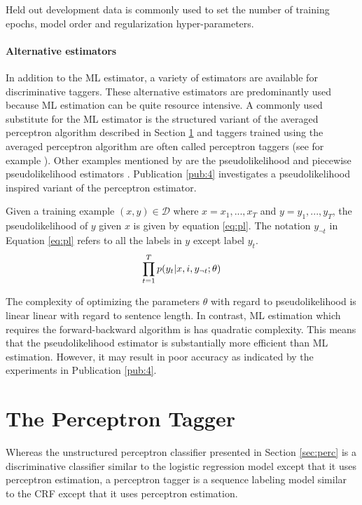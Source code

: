 Held out development data is commonly used to set the number of
training epochs, model order and regularization hyper-parameters.

\paragraph{Alternative estimators} In addition to the ML estimator, a
variety of estimators are available for discriminative taggers. These
alternative estimators are predominantly used because ML estimation
can be quite resource intensive. A commonly used substitute for the ML
estimator is the structured variant of the averaged perceptron
algorithm described in Section \ref{sec:prec-tagger} and taggers
trained using the averaged perceptron algorithm are often called
perceptron taggers (see for example \cite{Collins2002}). Other
examples mentioned by \cite{Sutton2012} are the pseudolikelihood
\cite{Besag1975} and piecewise pseudolikelihood estimators
\cite{Sutton2007}. Publication \ref{pub:4} investigates a
pseudolikelihood inspired variant of the perceptron estimator.

Given a training example $(x,y) \in \mathcal{D}$ where $x = x_1, ..., x_T$ and $y = y_1, ..., y_T$, the pseudolikelihood of $y$ given $x$ is given by equation \ref{eq:pl}. The notation $y_{\neg t}$ in Equation \ref{eq:pl} refers to all the labels in $y$ except label
$y_t$. 
\begin{equation}\label{eq:pl}\prod_{t = 1}^T p(y_t | x, i, y_{\neg t} \mbox{$ ; \, $} \theta)\end{equation}

The complexity of optimizing the parameters $\theta$ with regard to pseudolikelihood is linear linear with regard to sentence length. In contrast, ML estimation which requires the forward-backward algorithm is has quadratic complexity.
This means that the pseudolikelihood estimator is substantially more efficient than ML estimation. However, it
may result in poor accuracy as indicated by the experiments in Publication \ref{pub:4}.


\section{The Perceptron Tagger}
\label{sec:prec-tagger}

Whereas the unstructured perceptron classifier presented in Section
\ref{sec:perc} is a discriminative classifier similar to the logistic
regression model except that it uses perceptron estimation, a
perceptron tagger \citep{Collins2002} is a sequence labeling model
similar to the CRF except that it uses perceptron estimation.

